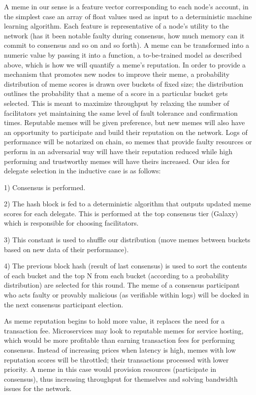 \documentclass{article}
\begin{document}
A meme in our sense is a feature vector corresponding to each node's account, in the simplest case an array of float values used as input to a deterministic machine learning algorithm. Each feature is representative of a node's utility to the network (has it been notable faulty during consensus, how much memory can it commit to consensus and so on and so forth). A meme can be transformed into a numeric value by passing it into a function, a to-be-trained model as described above, which is how we will quantify a meme's reputation. In order to provide a mechanism that promotes new nodes to improve their meme, a probability distribution of meme scores is drawn over buckets of fixed size; the distribution outlines the probability that a meme of a score in a particular bucket gets selected. This is meant to maximize throughput by relaxing the number of facilitators yet maintaining the same level of fault tolerance and confirmation times. Reputable memes will be given preference, but new memes will also have an opportunity to participate and build their reputation on the network. Logs of performance will be notarized on chain, so memes that provide faulty resources or perform in an adversarial way will have their reputation reduced while high performing and trustworthy memes will have theirs increased. Our idea for delegate selection in the inductive case is as follows:

1)	Consensus is performed.

2)	The hash block is fed to a deterministic algorithm that outputs updated meme scores for each delegate. This is performed at the top consensus tier (Galaxy) which is responsible for choosing facilitators.

3)	This constant is used to shuffle our distribution (move memes between buckets based on new data of their performance).

4)	The previous block hash (result of last consensus) is used to sort the contents of each bucket and the top N from each bucket (according to a probability distribution) are selected for this round. The meme of a consensus participant who acts faulty or provably malicious (as verifiable within logs) will be docked in the next consensus participant election.

As meme reputation begins to hold more value, it replaces the need for a transaction fee. Microservices may look to reputable memes for service hosting, which would be more profitable than earning transaction fees for performing consensus. Instead of increasing prices when latency is high, memes with low reputation scores will be throttled; their transactions processed with lower priority. A meme in this case would provision resources (participate in consensus), thus increasing throughput for themselves and solving bandwidth issues for the network.
\end{document}
